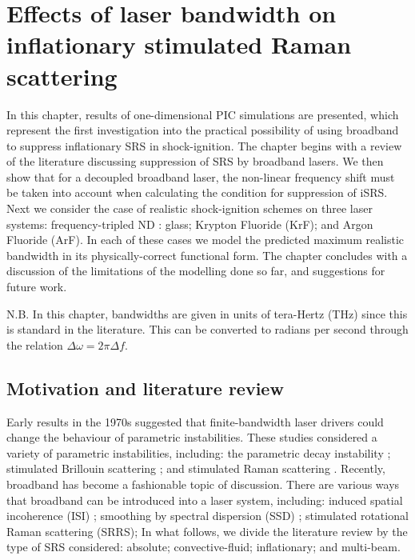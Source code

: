 \chapter{Effects of laser bandwidth on inflationary stimulated Raman scattering}
\label{chp:broadbandSRS}

In this chapter, results of one-dimensional PIC simulations are presented, which represent the first investigation into the practical possibility of using broadband to suppress inflationary SRS in shock-ignition. The chapter begins with a review of the literature discussing suppression of SRS by broadband lasers. We then show that for a decoupled broadband laser, the non-linear frequency shift must be taken into account when calculating the condition for suppression of iSRS. Next we consider the case of realistic shock-ignition schemes on three laser systems: frequency-tripled ND : glass; Krypton Fluoride (KrF); and Argon Fluoride (ArF). In each of these cases we model the predicted maximum realistic bandwidth in its physically-correct functional form. The chapter concludes with a discussion of the limitations of the modelling done so far, and suggestions for future work.

N.B. In this chapter, bandwidths are given in units of tera-Hertz (THz) since this is standard in the literature. This can be converted to radians per second through the relation $\Delta \omega = 2\pi \Delta f$. 

\section{Motivation and literature review}

Early results in the 1970s suggested that finite-bandwidth laser drivers could change the behaviour of parametric instabilities. These studies considered a variety of parametric instabilities, including: the parametric decay instability \citep{Thomson1974}; stimulated Brillouin scattering \citep{Kruer1973}; and stimulated Raman scattering \citep{raymer_theory_1979}. Recently, broadband has become a fashionable topic of discussion. There are various ways that broadband can be introduced into a laser system, including: induced spatial incoherence (\acrshort{ISI}) \citep{Lehmberg198327}; smoothing by spectral dispersion (\acrshort{SSD}) \citep{Skupsky1989}; stimulated rotational Raman scattering (SRRS);  In what follows, we divide the literature review by the type of SRS considered: absolute; convective-fluid; inflationary; and multi-beam. 

